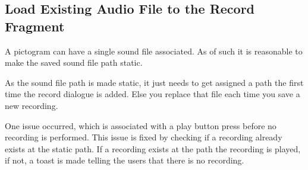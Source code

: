 \subsection{Load Existing Audio File to the Record Fragment}
A pictogram can have a single sound file associated.
As of such it is reasonable to make the saved sound file path static.

As the sound file path is made static, it just needs to get assigned a path the first time the record dialogue is added. 
Else you replace that file each time you save a new recording.

One issue occurred, which is associated with a play button press before no recording is performed.
This issue is fixed by checking if a recording already exists at the static path. If a recording exists at the path the recording is played, if not, a toast is made telling the users that there is no recording.